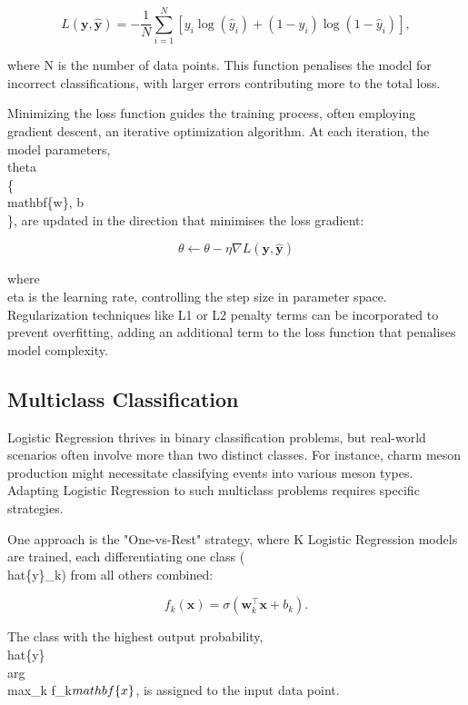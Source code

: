 \begin{equation}
L(\mathbf{y}, \hat{\mathbf{y}}) = -\frac{1}{N} \sum_{i=1}^N \left[ y_i \log(\hat{y}_i) + (1 - y_i) \log(1 - \hat{y}_i) \right],
\end{equation}

where N is the number of data points. This function penalises the model for incorrect classifications, with larger errors contributing more to the total loss.

Minimizing the loss function guides the training process, often employing gradient descent, an iterative optimization algorithm. At each iteration, the model parameters, \\theta \= \\\{\\mathbf\{w\}, b\\\}, are updated in the direction that minimises the loss gradient:

\begin{equation}
\theta \leftarrow \theta - \eta \nabla L(\mathbf{y}, \hat{\mathbf{y}})
\end{equation}

where \\eta is the learning rate, controlling the step size in parameter space. Regularization techniques like L1 or L2 penalty terms can be incorporated to prevent overfitting, adding an additional term to the loss function that penalises model complexity.

\subsection{Multiclass Classification}

Logistic Regression thrives in binary classification problems, but real-world scenarios often involve more than two distinct classes. For instance, charm meson production might necessitate classifying events into various meson types. Adapting Logistic Regression to such multiclass problems requires specific strategies.

One approach is the "One-vs-Rest" strategy, where K Logistic Regression models are trained, each differentiating one class (\\hat\{y\}\_k) from all others combined:

\begin{equation}
f_k(\mathbf{x}) = \sigma(\mathbf{w}_k^\top \mathbf{x} + b_k).
\end{equation}

The class with the highest output probability, \\hat\{y\} \= \\arg\\max\_k f\_k\(\\mathbf\{x\}\), is assigned to the input data point.

